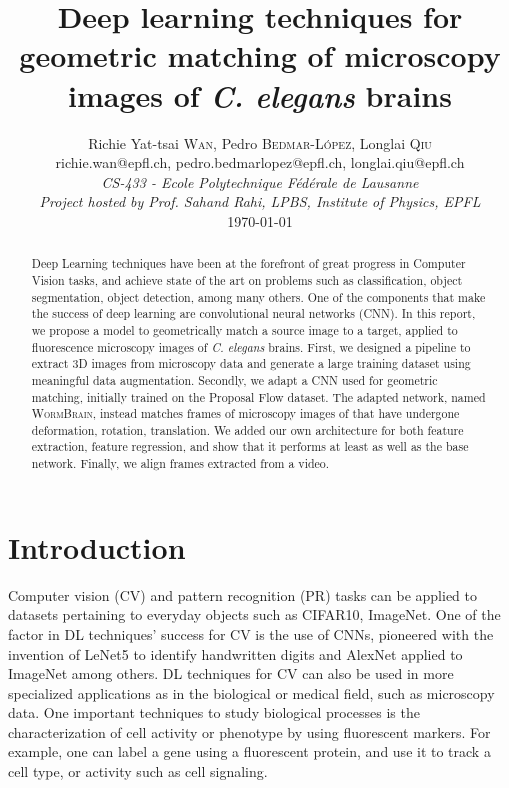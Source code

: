 \documentclass[10pt,conference,compsocconf]{IEEEtran}
\begin{document}
\title{Deep learning techniques for geometric matching of microscopy images of \textit{C. elegans} brains}

\author{
  Richie Yat-tsai \textsc{Wan}, Pedro \textsc{Bedmar-López},  Longlai \textsc{Qiu}\\
    richie.wan@epfl.ch, pedro.bedmarlopez@epfl.ch, longlai.qiu@epfl.ch\\
  \textit{CS-433 - Ecole Polytechnique Fédérale de Lausanne}\\
  \textit{Project hosted by Prof. Sahand Rahi, LPBS, Institute of Physics, EPFL}
  \\
  \today
}
\maketitle
\begin{abstract}
Deep Learning techniques have been at the forefront of great progress in Computer Vision  tasks, and achieve state of the art on problems such as classification, object segmentation, object detection, among many others. One of the components that make the success of deep learning are convolutional neural networks (CNN). In this report, we propose a model to geometrically match a source image to a target, applied to fluorescence microscopy images of \textit{C. elegans} brains. First, we designed a pipeline to extract 3D images from microscopy data and generate a large training dataset using meaningful data augmentation. Secondly, we adapt a CNN used for geometric matching, initially trained on the Proposal Flow dataset. The adapted network, named \textsc{WormBrain}, instead matches frames of microscopy images of that have undergone deformation, rotation, translation. We added our own architecture for both feature extraction, feature regression, and show that it performs at least as well as the base network. Finally, we align frames extracted from a video.
\end{abstract}

\section{\textbf{Introduction}}
\label{intro}
Computer vision (CV) and pattern recognition (PR) tasks can be applied to datasets pertaining to everyday objects such as CIFAR10, ImageNet. One of the factor in DL techniques' success for CV is the use of CNNs, pioneered with the invention of LeNet5\cite{lecun_gradient-based_1998} to identify handwritten digits and AlexNet \cite{krizhevsky_imagenet_2017} applied to ImageNet among others. DL techniques for CV can also be used in more specialized applications as in the biological or medical field, such as microscopy data. One important techniques to study biological processes is the characterization of cell activity or phenotype by using fluorescent markers. For example, one can label a gene using a fluorescent protein, and use it to track a cell type, or activity such as cell signaling\cite{jiang_specific_2016}. 
\end{document}
